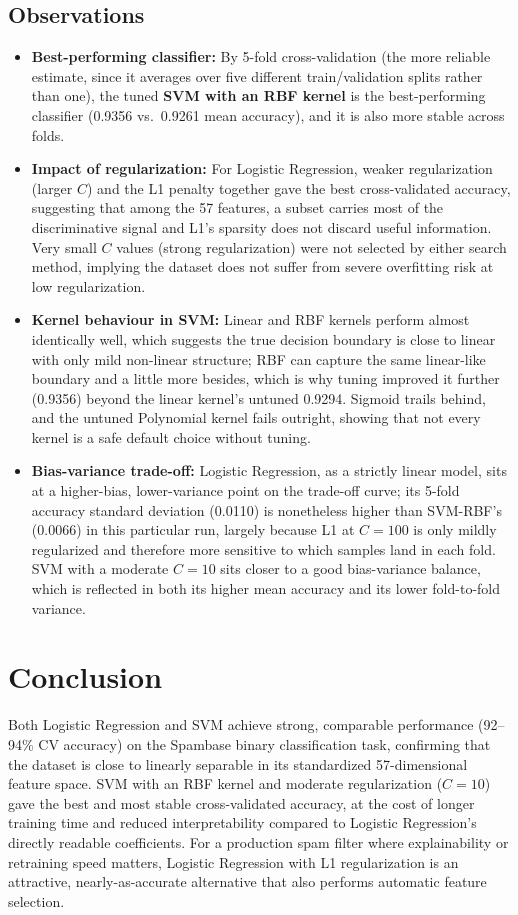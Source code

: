 \documentclass[12pt,a4paper]{article}
\begin{document}
\subsection*{Observations}
\begin{itemize}
\item \textbf{Best-performing classifier:} By 5-fold cross-validation (the more reliable
estimate, since it averages over five different train/validation splits rather than one),
the tuned \textbf{SVM with an RBF kernel} is the best-performing classifier (0.9356 vs.\
0.9261 mean accuracy), and it is also more stable across folds.
\item \textbf{Impact of regularization:} For Logistic Regression, weaker regularization
(larger $C$) and the L1 penalty together gave the best cross-validated accuracy,
suggesting that among the 57 features, a subset carries most of the discriminative
signal and L1's sparsity does not discard useful information. Very small $C$ values
(strong regularization) were not selected by either search method, implying the dataset
does not suffer from severe overfitting risk at low regularization.
\item \textbf{Kernel behaviour in SVM:} Linear and RBF kernels perform almost identically
well, which suggests the true decision boundary is close to linear with only mild
non-linear structure; RBF can capture the same linear-like boundary and a little more
besides, which is why tuning improved it further (0.9356) beyond the linear kernel's
untuned 0.9294. Sigmoid trails behind, and the untuned Polynomial kernel fails outright,
showing that not every kernel is a safe default choice without tuning.
\item \textbf{Bias-variance trade-off:} Logistic Regression, as a strictly linear model,
sits at a higher-bias, lower-variance point on the trade-off curve; its 5-fold accuracy
standard deviation (0.0110) is nonetheless higher than SVM-RBF's (0.0066) in this
particular run, largely because L1 at $C=100$ is only mildly regularized and therefore
more sensitive to which samples land in each fold. SVM with a moderate $C=10$ sits closer
to a good bias-variance balance, which is reflected in both its higher mean accuracy and
its lower fold-to-fold variance.
\end{itemize}

\section{Conclusion}
Both Logistic Regression and SVM achieve strong, comparable performance (92--94\% CV
accuracy) on the Spambase binary classification task, confirming that the dataset is
close to linearly separable in its standardized 57-dimensional feature space. SVM with an
RBF kernel and moderate regularization ($C=10$) gave the best and most stable
cross-validated accuracy, at the cost of longer training time and reduced
interpretability compared to Logistic Regression's directly readable coefficients. For a
production spam filter where explainability or retraining speed matters, Logistic
Regression with L1 regularization is an attractive, nearly-as-accurate alternative that
also performs automatic feature selection.
\end{document}
